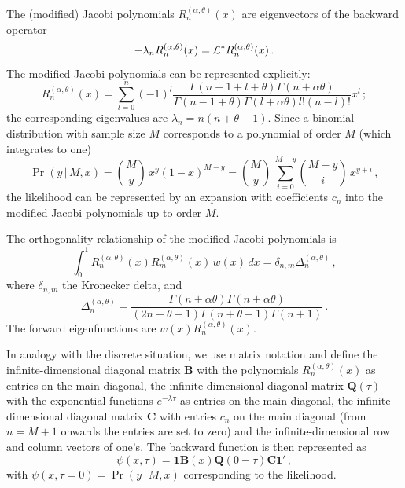\documentclass[preprint]{elsarticle}
\newcommand\given{{\,|\,}}
\newcommand\oneC{\ensuremath{\mathbf{1}'}}
\newcommand\oneR{\ensuremath{\mathbf{1}}}
\begin{document}
The (modified) Jacobi polynomials $R_n^{(\alpha,\theta)}(x)$ are eigenvectors of the backward operator
\begin{equation}
    -\lambda_nR_n^{(\alpha,\theta)}(x)={\cal L}^{*}R_n^{(\alpha,\theta)}(x)\,.
\end{equation}
The modified Jacobi polynomials can be represented explicitly:
\begin{equation}
  R_n^{(\alpha,\theta)}(x)=\sum_{l=0}^n(-1)^l\frac{\Gamma(n-1+l+\theta)\Gamma(n+\alpha\theta)}{\Gamma(n-1+\theta)\Gamma(l+\alpha\theta)l!(n-l)!}x^l\,;
\end{equation}
the corresponding eigenvalues are $\lambda_n=n(n+\theta-1)$. Since a binomial distribution with sample size $M$ corresponds to a polynomial of order $M$ (which integrates to one) 
\begin{equation}
\Pr(y\given M,x)=\binom{M}{y}\,x^{y}(1-x)^{M-y}
=\binom{M}{y}\,\sum_{i=0}^{M-y} \binom{M-y}{i}\,x^{y+i}\,,
\end{equation}
the likelihood can be represented by an expansion with coefficients $c_n$ into the modified Jacobi polynomials up to order $M$. 

The orthogonality relationship of the modified Jacobi polynomials is
\begin{equation}\label{eq:ortho_Jacobi}
    \int_0^1 R_n^{(\alpha,\theta)}(x) R_m^{(\alpha,\theta)}(x)\, w(x)\,dx=\delta_{n,m} \Delta_n^{(\alpha,\theta)}\,,
\end{equation}
where $\delta_{n,m}$ the Kronecker delta, and 
\begin{equation}
    \Delta_n^{(\alpha,\theta)}=\frac{\Gamma(n+\alpha\theta)\Gamma(n+\alpha\theta)}{(2n+\theta-1)\Gamma(n+\theta-1)\Gamma(n+1)}\,.
\end{equation}
The forward eigenfunctions are $w(x)R_n^{(\alpha,\theta)}(x)$.   

In analogy with the discrete situation, we use matrix notation and define the infinite-dimensional diagonal matrix $\mathbf{B}$ with the polynomials $R_n^{(\alpha,\theta)}(x)$ as entries on the main diagonal, the infinite-dimensional diagonal matrix $\mathbf{Q}(\tau)$ with the exponential functions $e^{-\lambda\tau}$ as entries on the main diagonal, the infinite-dimensional diagonal matrix $\mathbf{C}$ with entries $c_n$ on the main diagonal (from $n=M+1$ onwards the entries are set to zero) and the infinite-dimensional row and column vectors of one's. The backward function is then represented as
\begin{equation}
\psi(x,\tau)=\oneR\mathbf{B}(x)\mathbf{Q}(0-\tau)\mathbf{C}\oneC\,,
\end{equation}
with $\psi(x,\tau=0)=\Pr(y\given M,x)$ corresponding to the likelihood.
\end{document}
